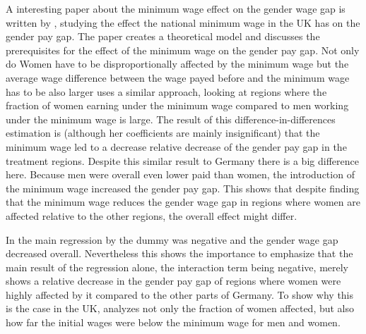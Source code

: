 \documentclass[12pt,draft,a4paper]{article}
\begin{document}
A interesting paper about the minimum wage effect on the gender wage gap is written by \citet{Robinson05UK}, studying the effect the national minimum wage in the UK has on the gender pay gap. The paper creates a theoretical model and discusses the prerequisites for the effect of the minimum wage on the gender pay gap. 
Not only do Women have to be disproportionally affected by the minimum wage but the average wage difference between the wage payed before and the minimum wage has to be also larger
 uses a similar approach, looking at regions where the fraction of women earning under the minimum wage compared to men working under the minimum wage is large. The result of this difference-in-differences estimation is (although her coefficients are mainly insignificant) that the minimum wage led to a decrease relative decrease of the gender pay gap in the treatment regions.
Despite this similar result to Germany there is a big difference here.
Because men were overall even lower paid than women, the introduction of the minimum wage increased the gender pay gap. This shows that despite finding that the minimum wage reduces the gender wage gap in regions where women are affected relative to the other regions, the overall effect might differ.

In the main regression by \citet{CALIENDO22} the dummy was negative and the gender wage gap decreased overall. Nevertheless this shows the importance to emphasize that the main result of the regression alone, the interaction term being negative, merely shows a relative decrease in the gender pay gap of regions where women were highly affected by it compared to the other parts of Germany.
To show why this is the case in the UK,  analyzes not only the fraction of women affected, but also how far the initial wages were below the minimum wage for men and women.
\end{document}
